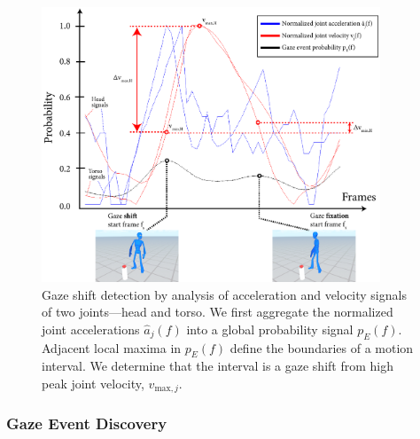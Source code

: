 \begin{figure}
\centering
\includegraphics[width=0.9\textwidth]{gazeauthoring/Figures/GazeInstanceInference.pdf}
\caption{Gaze shift detection by analysis of acceleration and velocity signals of two joints---head and torso. We first aggregate the normalized joint accelerations $\hat{a}_j(f)$ into a global probability signal $p_E(f)$. Adjacent local maxima in $p_E(f)$ define the boundaries of a motion interval. We determine that the interval is a gaze shift from high peak joint velocity, $v_{\mathrm{max},j}$.}
\label{fig:GazeInstanceInference}
\end{figure}

\subsubsection{Gaze Event Discovery}

